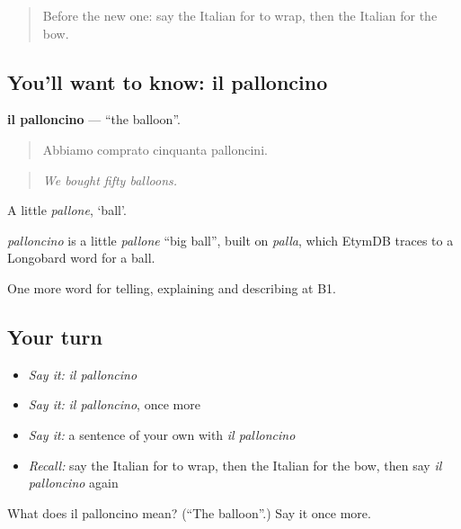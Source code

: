 \label{lesson:IT-C316-palloncino}



\begin{quote}
Before the new one: say the Italian for to wrap, then the Italian for the bow.
\end{quote}

\subsection*{You'll want to know: il palloncino}
\textbf{il palloncino} — \textquotedblleft{}the balloon\textquotedblright{}.

\begin{quote}
Abbiamo comprato cinquanta palloncini.
\end{quote}

\begin{quote}
\emph{We bought fifty balloons.}
\end{quote}

A little \emph{pallone}, ‘ball’.

\begin{cousinweb}
\emph{palloncino} is a little \emph{pallone} \textquotedblleft{}big ball\textquotedblright{}, built on \emph{palla}, which EtymDB traces to a Longobard word for a ball.
\end{cousinweb}

\begin{grammarlens}[title={What you've built}]
One more word for telling, explaining and describing at B1.
\end{grammarlens}

\subsection*{Your turn}
\begin{itemize}
\raggedright
  \item \emph{Say it:} \emph{il palloncino}
  \item \emph{Say it:} \emph{il palloncino}, once more
  \item \emph{Say it:} a sentence of your own with \emph{il palloncino}
  \item \emph{Recall:} say the Italian for to wrap, then the Italian for the bow, then say \emph{il palloncino} again
\end{itemize}

\begin{tcolorbox}[breakable,colback=teal!4,colframe=teal!35!black,title={Before you move on}]
What does il palloncino mean? (\textquotedblleft{}The balloon\textquotedblright{}.) Say it once more.
\end{tcolorbox}
